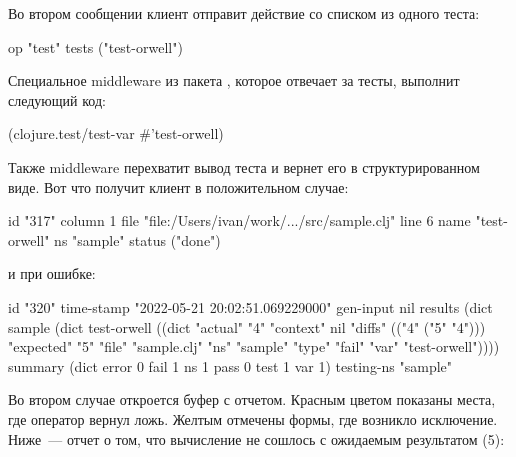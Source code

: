 Во втором сообщении клиент отправит действие  со списком из одного теста:

\begin{english}
  \begin{text}
  op     "test"
  tests  ("test-orwell")
  \end{text}
\end{english}

\pagebreaklarge

Специальное middleware из пакета , которое отвечает за тесты, выполнит следующий код:

\begin{english}
  \begin{clojure}
(clojure.test/test-var #'test-orwell)
  \end{clojure}
\end{english}

Также middleware перехватит вывод теста и вернет его в структурированном виде. Вот что получит клиент в положительном случае:

\begin{english}
  \begin{text}
  id      "317"
  column  1
  file    "file:/Users/ivan/work/.../src/sample.clj"
  line    6
  name    "test-orwell"
  ns      "sample"
  status  ("done")
  \end{text}
\end{english}

\noindent
и при ошибке:

\begin{english}
  \begin{text}
  id         "320"
  time-stamp "2022-05-21 20:02:51.069229000"
  gen-input  nil
  results    (dict sample
               (dict test-orwell
                 ((dict "actual" "4"
                        "context" nil
                        "diffs" (("4" ("5" "4")))
                        "expected" "5"
                        "file" "sample.clj"
                        "ns" "sample"
                        "type" "fail"
                        "var" "test-orwell"))))
  summary    (dict error 0 fail 1
                   ns 1 pass 0 test 1 var 1)
  testing-ns "sample"
  \end{text}
\end{english}

Во втором случае откроется буфер  с отчетом. Красным цветом показаны места, где оператор  вернул ложь. Желтым отмечены формы, где возникло исключение. Ниже~--- отчет о том, что вычисление  не сошлось с ожидаемым результатом (5):

